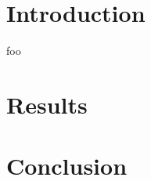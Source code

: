 \documentclass{article}
\author{\hwauthor}
\title{\hwtitle}
\date{\hwdate}
\begin{document}
\maketitle
\thispagestyle{fancy}

\section{Introduction}

foo

\section{Results}

\bigskip
{}
\medskip

\section{Conclusion}
\end{document}
